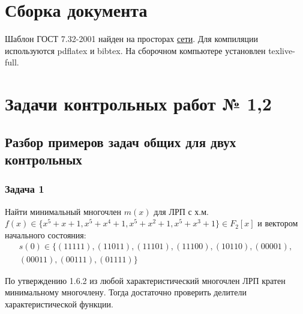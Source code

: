 \documentclass[utf8x, 14pt]{G7-32} %
\begin{document}



\chapter{Сборка документа}
\label{cha:design}
Шаблон ГОСТ 7.32-2001 найден на просторах \href{https://github.com/latex-g7-32/latex-g7-32/tree/master/tex}{сети}.
Для компиляции используются pdflatex и bibtex. На сборочном компьютере установлен texlive-full.


\mainmatter %

\chapter{Задачи контрольных работ № 1,2}
\section{Разбор примеров задач общих для двух контрольных}
\subsection{Задача 1}
Найти минимальный многочлен $m(x)$ для ЛРП с х.м. $f(x)\in\{x^5+x+1, x^5+x^4+1, x^5+x^2+1, x^5+x^3+1\}\in F_2[x]$ и вектором начального состояния: $$\begin{aligned}s(0)\in\{(11111), (11011), (11101), (11100), (10110), (00001), \\ (00011), (00111), (01111)\}\end{aligned}$$

По утверждению 1.6.2 из \cite{hse:Teoria_Gener} любой характеристический многочлен ЛРП кратен минимальному многочлену. Тогда достаточно проверить делители характеристической функции.
\end{document}
